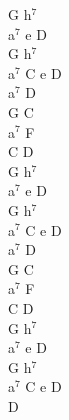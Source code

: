 \documentclass[a5paper, 10pt]{book}
\begin{document}
\begin{minipage}[t]{0.2\textwidth}
G h$^7$\\
a$^7$ e D\\
G h$^7$\\
a$^7$ C e D\\

a$^7$ D\\
G C\\
a$^7$ F\\ 
C  D \\

G h$^7$\\
a$^7$ e D\\
G h$^7$\\
a$^7$ C e D\\

a$^7$ D\\
G C\\
a$^7$ F\\ 
C  D \\

G h$^7$\\
a$^7$ e D\\
G h$^7$\\
a$^7$ C e D\\

D\\
\end{minipage}

\newpage
\end{document}
